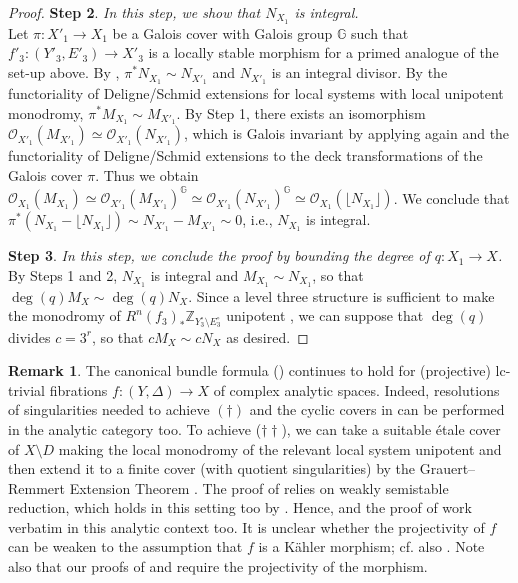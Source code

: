 \documentclass{amsart}
\theoremstyle{definition}
\newtheorem{remark}[theorem]{Remark}
\theoremstyle{remark}
\def\bZ{\mathbb{Z}}
\numberwithin{equation}{section}
\begin{document}
\begin{proof}
    \textbf{Step 2}. 
    \emph{In this step, we show that $N_{X_1}$ is integral.}\\
    \noindent
    Let $\pi \colon X'_1 \to X_1$ be a Galois cover with Galois group $\mathbb{G}$ such that $f'_3 \colon (Y'_3, E'_3) \to X'_3$ is a locally stable morphism for a primed analogue of the set-up above. By \cite[Prop.~5.5, Lem. 5.2.(5)]{Amb04}, $\pi^* N_{X_1} \sim N_{X'_{1}}$ and $N_{X'_{1}}$ is an integral divisor. By the functoriality of Deligne/Schmid extensions for local systems with local unipotent monodromy, $\pi^* M_{X_1} \sim M_{X'_{1}}$. By Step 1, there exists an isomorphism $\mathcal{O}_{X'_{1}}(M_{X'_1}) \simeq \mathcal{O}_{X'_{1}}(N_{X'_{1}})$, which is Galois invariant by applying again \cite[Prop.~5.5]{Amb04} and the functoriality of Deligne/Schmid extensions to the deck transformations of the Galois cover $\pi$. Thus we obtain $\mathcal{O}_{X_{1}}(M_{X_1}) \simeq \mathcal{O}_{X'_{1}}(M_{X'_1})^{\mathbb{G}} \simeq \mathcal{O}_{X'_{1}}(N_{X'_{1}})^{\mathbb{G}} \simeq \mathcal{O}_{X_{1}}(\lfloor N_{X_{1}} \rfloor)$. We conclude that $\pi^*(N_{X_1}-\lfloor N_{X_1}\rfloor)\sim N_{X'_1}-M_{X'_1}\sim 0$, i.e., $N_{X_1}$ is integral.

    \textbf{Step 3}. 
    \emph{In this step, we conclude the proof by bounding the degree of $q \colon X_1 \to X$.}\\
    \noindent
    By Steps 1 and 2, $N_{X_1}$ is integral and $M_{X_1} \sim N_{X_1}$, so that $\deg(q) M_{X} \sim \deg(q) N_{X}$. Since a level three structure is sufficient to make the monodromy of $R^{n}(f_3)_*\bZ_{Y^{\circ}_{3} \setminus E^{\circ}_{3}}$ unipotent \cite[p.~253, p.~207 Lem.]{Mum70}, we can suppose that $\deg(q)$ divides $c=3^{r}$, so that $cM_{X} \sim c N_{X}$ as desired. 
\end{proof}

\begin{remark}\label{rmk:analcanonicalbundle}
The canonical bundle formula () continues to hold for (projective) lc-trivial fibrations $f \colon (Y, \Delta) \to X$ of complex analytic spaces. Indeed, resolutions of singularities needed to achieve $(\dagger)$ and the cyclic covers in \cite[2.49-53]{KM98} can be performed in the analytic category too. To achieve ($\dagger \dagger$), we can take a suitable \'{e}tale cover of $X \setminus D$ making the local monodromy of the relevant local system unipotent and then extend it to a finite cover (with quotient singularities) by the Grauert--Remmert Extension Theorem \cite[Ch.~XII, Thm.~5.4,
p.~340]{SGA1}. The proof of  relies on weakly semistable reduction, which holds in this setting too by \cite[Thm 1.17]{HaconPaun}. Hence,  and the proof of  work verbatim in this analytic context too. It is unclear whether the projectivity of $f$ can be weaken to the assumption that $f$ is a K\"{a}hler morphism; cf. also . Note also that our proofs of  and  require the projectivity of the morphism.
\end{remark}
\end{document}
